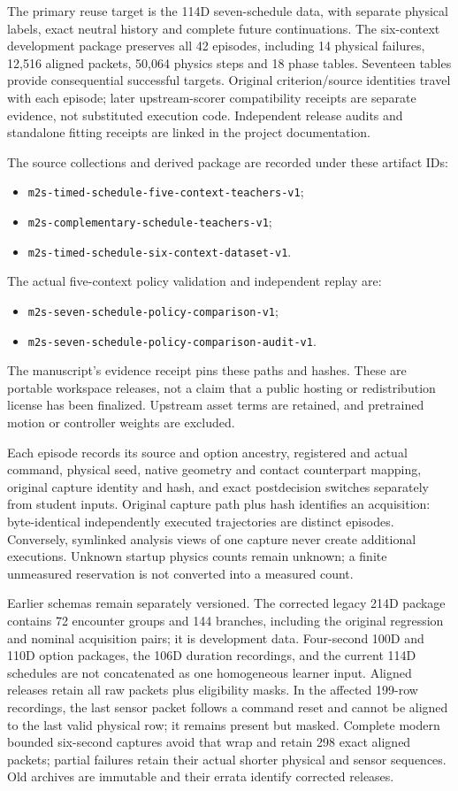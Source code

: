 The primary reuse target is the 114D seven-schedule data, with separate physical
labels, exact neutral history and complete future continuations. The
six-context development package preserves all 42 episodes, including 14 physical failures,
12,516 aligned packets, 50,064 physics steps and 18 phase tables. Seventeen tables
provide consequential successful targets. Original criterion/source identities
travel with each episode; later upstream-scorer compatibility receipts are
separate evidence, not substituted execution code. Independent release audits
and standalone fitting receipts are linked in the project documentation.

The source collections and derived package are recorded under these artifact IDs:
\begin{itemize}
\item \texttt{m2s-timed-schedule-five-context-teachers-v1};
\item \texttt{m2s-complementary-schedule-teachers-v1};
\item \texttt{m2s-timed-schedule-six-context-dataset-v1}.
\end{itemize}
The actual five-context policy validation and independent replay are:
\begin{itemize}
\item \texttt{m2s-seven-schedule-policy-comparison-v1};
\item \texttt{m2s-seven-schedule-policy-comparison-audit-v1}.
\end{itemize}
The manuscript's evidence receipt pins these paths and hashes. These are portable
workspace releases, not a claim that a public hosting or redistribution license
has been finalized. Upstream asset terms are retained, and pretrained motion or
controller weights are excluded.

Each episode records its source and option ancestry, registered and actual command,
physical seed, native geometry and contact counterpart mapping, original capture
identity and hash, and exact postdecision switches separately from student inputs.
Original capture path plus hash identifies an acquisition: byte-identical
independently executed trajectories are distinct episodes. Conversely, symlinked
analysis views of one capture never create additional executions. Unknown startup
physics counts remain unknown; a finite unmeasured reservation is not converted
into a measured count.

Earlier schemas remain separately versioned. The corrected legacy 214D package
contains 72 encounter groups and 144 branches, including the original regression
and nominal acquisition pairs; it is development data. Four-second 100D and
110D option packages, the 106D duration recordings, and the current 114D schedules
are not concatenated as one homogeneous learner input. Aligned releases retain
all raw packets plus eligibility masks. In the affected 199-row recordings, the
last sensor packet follows a command reset and cannot be aligned to the last
valid physical row; it remains present but masked. Complete modern bounded six-second
captures avoid that wrap and retain 298 exact aligned packets; partial failures
retain their actual shorter physical and sensor sequences. Old archives are
immutable and their errata identify corrected releases.

